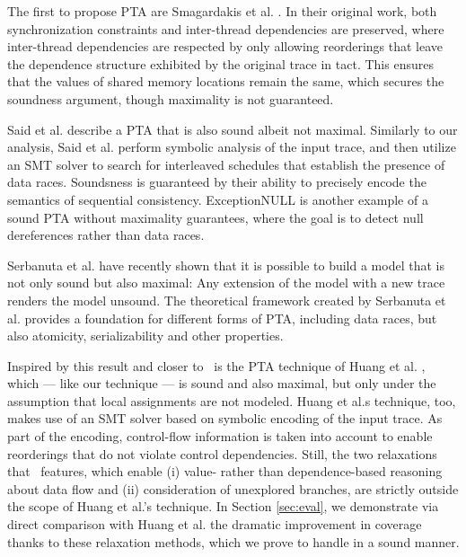 The first to propose PTA are Smagardakis et al. \cite{yannis}. In their original work, both synchronization constraints and inter-thread dependencies are preserved, where inter-thread dependencies are respected by 
only allowing reorderings that leave the dependence structure exhibited by the original trace in tact. This ensures that the values of shared memory locations remain the same, which secures the soundness argument, though maximality is not guaranteed.

Said et al. \cite{Said:2011} describe a PTA that is also sound albeit not maximal. Similarly to our analysis, Said et al. perform symbolic analysis of the input trace, and then utilize an SMT solver to search for interleaved schedules that establish the presence of data races. Soundsness is guaranteed by their ability to precisely encode the semantics of sequential consistency. ExceptionNULL \cite{Farzan:2012} is another example of a sound PTA without maximality guarantees, where the goal is to detect null dereferences rather than data races. 

Serbanuta et al. \cite{SerbanutaCR12} have recently shown that it is possible to build a model that is not only sound but also maximal: Any extension of the model with a new trace renders the model unsound. The theoretical framework created by Serbanuta et al. provides a foundation for different forms of PTA, including data races, but also atomicity, serializability and other properties. 

Inspired by this result and closer to \tool\ is the PTA technique of Huang et al. \cite{HuangMR14}, which --- like our technique --- is sound and also maximal, but only under the assumption that local assignments are not modeled. Huang et al.s technique, too, makes use of an SMT solver based on symbolic encoding of the input trace. As part of the encoding, control-flow information is taken into account to enable reorderings that do not violate control dependencies. Still, the two relaxations that \tool\ features, which enable (i) value- rather than dependence-based reasoning about data flow and (ii) consideration of unexplored branches, are strictly outside the scope of Huang et al.'s technique. In Section \ref{sec:eval}, we demonstrate via direct comparison with Huang et al. the dramatic improvement in coverage thanks to these relaxation methods, which we prove to handle in a sound manner.


